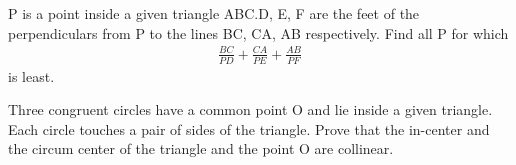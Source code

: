 \item P is a point inside a given triangle ABC.D, E, F are the feet of the perpendiculars from P to the lines BC, CA, AB respectively. Find all P for which
\begin{align*}
\frac{BC}{PD} + \frac{CA}{PE} + \frac{AB}{PF}
\end{align*}
is least.

\item Three congruent circles have a common point O and lie inside a given triangle. Each circle touches a pair of sides of the triangle. Prove that the in-center and the circum center of the triangle and the point O are collinear.

